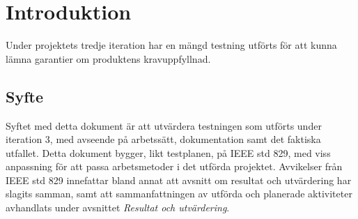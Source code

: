\section{Introduktion}
Under projektets tredje iteration har en mängd testning utförts för att kunna lämna garantier om produktens kravuppfyllnad. 
\subsection{Syfte}
Syftet med detta dokument är att utvärdera testningen som utförts under iteration 3, med avseende på arbetssätt, dokumentation samt det faktiska utfallet. Detta dokument bygger, likt testplanen, på IEEE std 829, med viss anpassning för att passa arbetsmetoder i det utförda projektet. Avvikelser från IEEE std 829 innefattar bland annat att avsnitt om resultat och utvärdering har slagits samman, samt att sammanfattningen av utförda och planerade aktiviteter avhandlats under avsnittet \textit{Resultat och utvärdering}.
 

